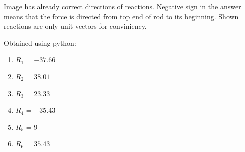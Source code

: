 Image has already correct directions of reactions. Negative sign in the answer
means that the force is directed from top end of rod to its beginning. 
Shown reactions are only unit vectors for conviniency.

Obtained using python:


\begin{answer}
    \begin{enumerate}
        \item $R_1$ = $-37.66$
        \item $R_2$ = $38.01$
        \item $R_3$ = $23.33$
        \item $R_4$ = $-35.43$
        \item $R_5$ = $9$
        \item $R_6$ = $35.43$
    \end{enumerate}
\end{answer}
